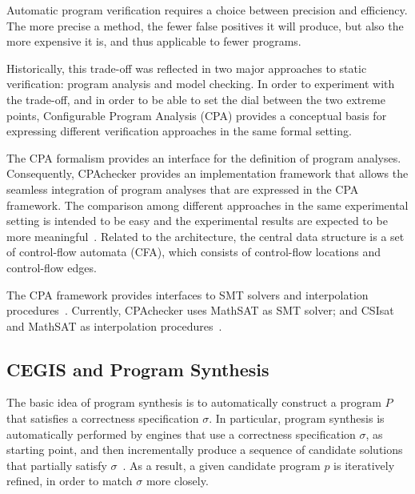 Automatic program verification requires a choice between precision and efficiency. The more precise a method, the fewer false positives it will produce, but also the more expensive it is, and thus applicable to fewer programs. 

Historically, this trade-off was reflected in two major approaches to static verification: program analysis and model checking. In order to experiment with the trade-off, and in order to be able to set the dial between the two extreme points, Configurable Program Analysis (CPA) provides a conceptual basis for expressing different verification approaches in the same formal setting. 

The CPA formalism provides an interface for the definition of program analyses. Consequently, CPAchecker provides an implementation framework that allows the seamless integration of program analyses that are expressed in the CPA framework. The comparison among different approaches in the same experimental setting is intended to be easy and the experimental results are expected to be more meaningful~\cite{Beyer2011}. Related to the architecture, the central data structure is a set of control-flow automata (CFA), which consists of control-flow locations and control-flow edges. 

The CPA framework provides interfaces to SMT solvers and interpolation procedures~\cite{Beyer2011}. Currently, CPAchecker uses MathSAT as SMT solver; and CSIsat and MathSAT as interpolation procedures~\cite{Beyer2011}. %

\subsection{CEGIS and Program Synthesis}
\label{sec:ProgramSynthesis}

The basic idea of program synthesis is to automatically construct a program $P$ that satisfies a correctness specification $\sigma$. In particular, program synthesis is automatically performed by engines that use a correctness specification $\sigma$, as starting point, and then incrementally produce a sequence of candidate solutions that partially satisfy $\sigma$~\cite{Abateetal2017}. As a result, a given candidate program $p$ is iteratively refined, in order to match $\sigma$ more closely. 

